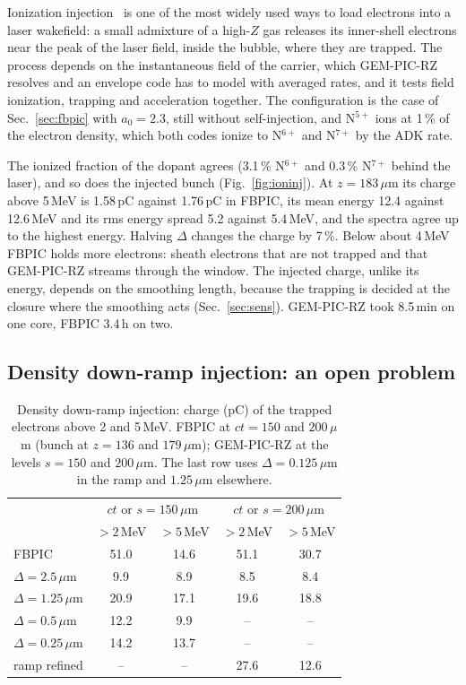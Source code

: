 \documentclass[preprint,12pt]{elsarticle}
\begin{document}
Ionization injection~\cite{Pak2010,McGuffey2010} is one of the most widely used ways to load electrons into a laser wakefield: a small admixture of a high-$Z$ gas releases its inner-shell electrons near the peak of the laser field, inside the bubble, where they are trapped. The process depends on the instantaneous field of the carrier, which GEM-PIC-RZ resolves and an envelope code has to model with averaged rates, and it tests field ionization, trapping and acceleration together. The configuration is the case of Sec.~\ref{sec:fbpic} with $a_0 = 2.3$, still without self-injection, and N$^{5+}$ ions at 1\,\% of the electron density, which both codes ionize to N$^{6+}$ and N$^{7+}$ by the ADK rate.

The ionized fraction of the dopant agrees (3.1\,\% N$^{6+}$ and 0.3\,\% N$^{7+}$ behind the laser), and so does the injected bunch (Fig.~\ref{fig:ioninj}). At $z = 183\,\mu$m its charge above 5\,MeV is 1.58\,pC against 1.76\,pC in FBPIC, its mean energy 12.4 against 12.6\,MeV and its rms energy spread 5.2 against 5.4\,MeV, and the spectra agree up to the highest energy. Halving $\Delta$ changes the charge by 7\,\%. Below about 4\,MeV FBPIC holds more electrons: sheath electrons that are not trapped and that GEM-PIC-RZ streams through the window. The injected charge, unlike its energy, depends on the smoothing length, because the trapping is decided at the closure where the smoothing acts (Sec.~\ref{sec:sens}). GEM-PIC-RZ took 8.5\,min on one core, FBPIC 3.4\,h on two.


\subsection{Density down-ramp injection: an open problem}\label{sec:downramp}

\begin{table}[!htbp]
\caption{Density down-ramp injection: charge (pC) of the trapped electrons above 2 and 5\,MeV. FBPIC at $ct = 150$ and $200\,\mu$m (bunch at $z = 136$ and $179\,\mu$m); GEM-PIC-RZ at the levels $s = 150$ and $200\,\mu$m. The last row uses $\Delta = 0.125\,\mu$m in the ramp and $1.25\,\mu$m elsewhere.}\label{tab:downramp}
\begin{tabular}{lcccc}
\toprule
 & \multicolumn{2}{c}{$ct$ or $s = 150\,\mu$m} & \multicolumn{2}{c}{$ct$ or $s = 200\,\mu$m} \\
 & $>2$\,MeV & $>5$\,MeV & $>2$\,MeV & $>5$\,MeV \\
\midrule
FBPIC & 51.0 & 14.6 & 51.1 & 30.7 \\
$\Delta = 2.5\,\mu$m & 9.9 & 8.9 & 8.5 & 8.4 \\
$\Delta = 1.25\,\mu$m & 20.9 & 17.1 & 19.6 & 18.8 \\
$\Delta = 0.5\,\mu$m & 12.2 & 9.9 & -- & -- \\
$\Delta = 0.25\,\mu$m & 14.2 & 13.7 & -- & -- \\
ramp refined & -- & -- & 27.6 & 12.6 \\
\bottomrule
\end{tabular}
\end{table}
\end{document}
